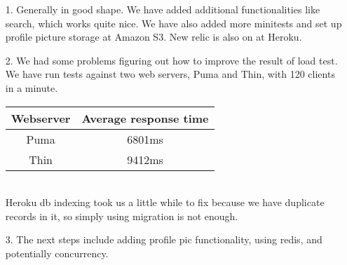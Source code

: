 \documentclass[]{article}
\begin{document}
\begin{enumerate}
	\item[1.]
	Generally in good shape. We have added additional functionalities like search, which works quite nice. We have also added more minitests and set up profile picture storage at Amazon S3. New relic is also on at Heroku. 
	\item[2.]
	We had some problems figuring out how to improve the result of load test. We have run tests against two web servers, Puma and Thin, with 120 clients in a minute.  \\
	\begin{tabular}{|c|c|}
	\hline
	Webserver & Average response time \\ \hline
	Puma & 6801ms \\
	Thin & 9412ms \\ \hline
	\end{tabular} \\
	Heroku db indexing took us a little while to fix because we have duplicate records in it, so simply using migration is not enough.
	\item[3.]
	The next steps include adding profile pic functionality, using redis, and potentially concurrency. 
\end{enumerate}
\end{document}
